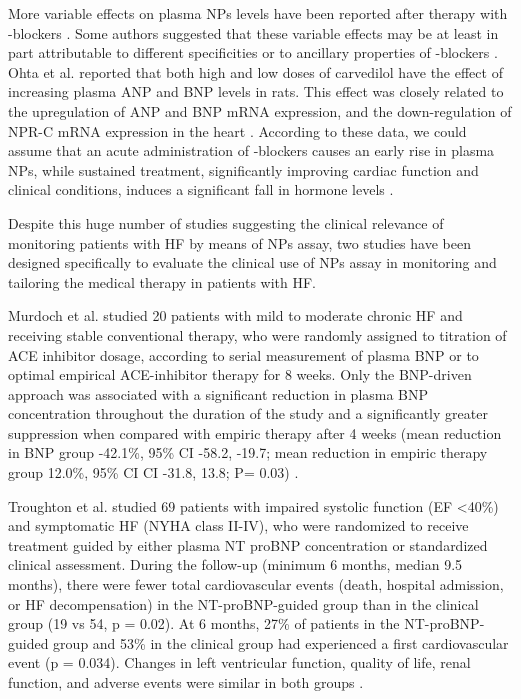 \documentclass[14pt,a4paper,onecolumn]{extarticle}
\begin{document}
More variable effects on plasma NPs levels have been reported after therapy with \beta-blockers \citep{bib390} \citep{bib3278} \citep{bib3279} \citep{bib3280} \citep{bib3281} \citep{bib3282} \citep{bib3283} \citep{bib3284} \citep{bib3285} \citep{bib3286} \citep{bib3287} \citep{bib3288} \citep{bib3289} \citep{bib3290} \citep{bib3291} \citep{bib3292}. Some authors suggested that these variable effects may be at least in part attributable to different specificities or to ancillary properties of \beta-blockers \citep{bib362}. Ohta et al. \citep{bib3293} reported that both high and low doses of carvedilol have the effect of increasing plasma ANP and BNP levels in rats. This effect was closely related to the upregulation of ANP and BNP mRNA expression, and the down-regulation of NPR-C mRNA expression in the heart \citep{bib3293}. According to these data, we could assume that an acute administration of \beta-blockers causes an early rise in plasma NPs, while sustained treatment, significantly improving cardiac function and clinical conditions, induces a significant fall in hormone levels \citep{bib390} \citep{bib3284} \citep{bib3287} \citep{bib3289} \citep{bib3290}.

Despite this huge number of studies suggesting the clinical relevance of monitoring patients with HF by means of NPs assay, two studies \citep{bib3252} \citep{Troughton2000} have been designed specifically to evaluate the clinical use of NPs assay in monitoring and tailoring the medical therapy in patients with HF.

Murdoch et al. \citep{bib3252} studied 20 patients with mild to moderate chronic HF and receiving stable conventional therapy, who were randomly assigned to titration of ACE inhibitor dosage, according to serial measurement of plasma BNP or to optimal empirical ACE-inhibitor therapy for 8 weeks. Only the BNP-driven approach was associated with a significant reduction in plasma BNP concentration throughout the duration of the study and a significantly greater suppression when compared with empiric therapy after 4 weeks (mean reduction in BNP group -42.1\%, 95\% CI -58.2, -19.7; mean reduction in empiric therapy group  12.0\%, 95\% CI CI -31.8, 13.8; P= 0.03) \citep{bib3252}.

Troughton et al. studied 69 patients with impaired systolic function (EF <40\%) and symptomatic HF (NYHA class II-IV), who were randomized to receive treatment guided by either plasma NT proBNP concentration or standardized clinical assessment. During the follow-up (minimum 6 months, median 9.5 months), there were fewer total cardiovascular events (death, hospital admission, or HF decompensation) in the NT-proBNP-guided group than in the clinical group (19 vs 54, p = 0.02). At 6 months, 27\% of patients in the NT-proBNP-guided group and 53\% in the clinical group had experienced a first cardiovascular event (p = 0.034). Changes in left ventricular function, quality of life, renal function, and adverse events were similar in both groups \citep{Troughton2000}.
\end{document}

